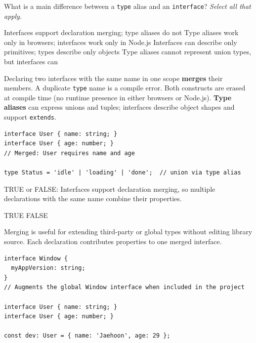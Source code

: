 \question[4]
What is a main difference between a \lstinline[style=tsinline]|type| alias and an \lstinline[style=tsinline]|interface|? \emph{Select all that apply.}
\begin{checkboxes}
  \CorrectChoice Interfaces support declaration merging; type aliases do not
  \choice Type aliases work only in browsers; interfaces work only in Node.js
  \choice Interfaces can describe only primitives; types describe only objects
  \choice Type aliases cannot represent union types, but interfaces can
\end{checkboxes}
\begin{solution}
  Declaring two interfaces with the same name in one scope \textbf{merges} their members. A duplicate \lstinline[style=tsinline]|type| name is a compile error. Both constructs are erased at compile time (no runtime presence in either browsers or Node.js). \textbf{Type aliases} can express unions and tuples; interfaces describe object shapes and support \lstinline[style=tsinline]|extends|.
\begin{lstlisting}[style=ts]
interface User { name: string; }
interface User { age: number; }
// Merged: User requires name and age

type Status = 'idle' | 'loading' | 'done';  // union via type alias
\end{lstlisting}
\end{solution}

\question[4]
TRUE or FALSE: Interfaces support declaration merging, so multiple declarations with the same name combine their properties.
\begin{choices}
  \CorrectChoice TRUE
  \choice FALSE
\end{choices}
\begin{solution}
  Merging is useful for extending third-party or global types without editing library source. Each declaration contributes properties to one merged interface.
\begin{lstlisting}[style=ts]
interface Window {
  myAppVersion: string;
}
// Augments the global Window interface when included in the project

interface User { name: string; }
interface User { age: number; }

const dev: User = { name: 'Jaehoon', age: 29 };
\end{lstlisting}
\end{solution}



\newpage




